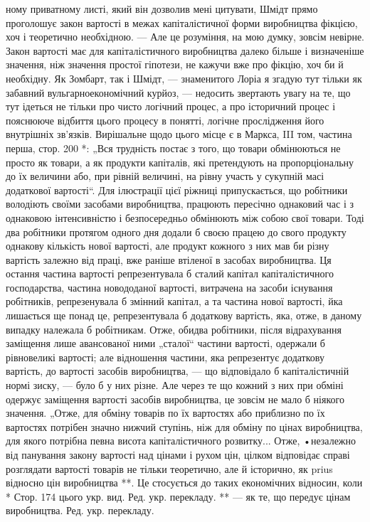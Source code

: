 \parcont{}  %
ному приватному листі, який він дозволив мені цитувати, Шмідт прямо проголошує закон вартості в межах капіталістичної форми виробництва фікцією, хоч і теоретично необхідною. — Але це розуміння, на мою думку, зовсім невірне. Закон вартості має для
капіталістичного виробництва далеко більше і визначеніше значення, ніж значення простої гіпотези, не кажучи вже про фікцію,
хоч би й необхідну. Як Зомбарт, так і Шмідт, — знаменитого Лоріа я згадую тут тільки як забавний вульгарноекономічний
курйоз, — недосить звертають увагу на те, що тут ідеться не тільки про чисто логічний процес, а про історичний процес і
пояснююче відбиття цього процесу в понятті, логічне прослідження його внутрішніх зв’язків. Вирішальне щодо цього місце є в
Маркса, III том, частина перша, стор. 200 *: „Вся трудність постає з того, що товари обмінюються не просто як товари, а як
продукти капіталів, які претендують на пропорціональну до їх величини або, при рівній величині, на рівну участь у сукупній
масі додаткової вартості“.  Для ілюстрації цієї ріжниці припускається, що робітники володіють своїми засобами виробництва,
працюють пересічно однаковий час і з однаковою інтенсивністю і безпосередньо обмінюють між собою свої товари. Тоді два
робітники протягом одного дня додали б своєю працею до свого продукту однакову кількість нової вартості, але продукт кожного
з них мав би різну вартість залежно від праці, вже раніше втіленої в засобах виробництва. Ця остання частина вартості
репрезентувала б сталий капітал капіталістичного господарства, частина новододаної вартості, витрачена на засоби існування
робітників, репрезенувала б змінний капітал, а та частина нової вартості, йка лишається ще понад це, репрезентувала б
додаткову вартість, яка, отже, в даному випадку належала б робітникам. Отже, обидва робітники, після відрахування заміщення
лише авансованої ними „сталої“ частини вартості, одержали б рівновеликі вартості; але відношення частини, яка репрезентує
додаткову вартість, до
вартості засобів виробництва, — що відповідало б капіталістичній нормі зиску, — було б у них різне. Але через те що кожний з них при обміні одержує заміщення вартості засобів виробництва, це зовсім не мало б ніякого значення. „Отже, для обміну
товарів по їх вартостях або приблизно по їх вартостях потрібен значно нижчий ступінь, ніж для обміну по цінах виробництва,
для якого потрібна певна висота капіталістичного розвитку... Отже, •незалежно від панування закону вартості над цінами і
рухом цін, цілком відповідає справі розглядати вартості товарів не тільки теоретично, але й історично, як prius відносно цін
виробництва **. Це стосується до таких економічних відносин, коли
* Стор. 174 цього укр. вид. Ред. укр. перекладу. ** — як те, що передує цінам виробництва. Ред. укр. перекладу.
\parbreak{}  %
